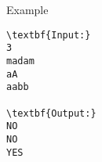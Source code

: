 Example  
\begin{verbatim}
\textbf{Input:}
3
madam
aA
aabb

\textbf{Output:}
NO
NO
YES 
\end{verbatim}